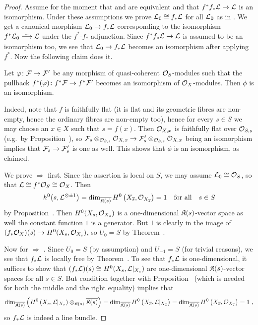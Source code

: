 \documentclass[a4paper,parskip=half,numbers=enddot, DIV=12]{scrreprt}
\begin{document}
\begin{proof}
	Assume for the moment that  and  are equivalent and that $f^*f_*\Ll\morphism \Ll$ is an isomorphism. Under these assumptions we prove $\mathcal{L}_0\cong f_*\mathcal{L}$ for all $\mathcal{L}_0$ as in . We get a canonical morphism $\Ll_0\morphism f_*\Ll$ corresponding to the isomorphism $f^*\Ll_0\isomorphism \Ll$ under the $f^*$-$f_*$ adjunction. Since $f^*f_*\Ll\morphism\Ll$ is assumed to be an isomorphism too, we see that $\Ll_0\morphism f_*\Ll$ becomes an isomorphism after applying $f^*$. Now the following claim does it.
	\begin{claim}
		Let $\phi\colon \Ff\morphism\Ff'$ be any morphism of quasi-coherent $\mathcal{O}_S$-modules such that the pullback $f^*(\phi)\colon f^*\Ff\morphism  f^*\Ff'$ becomes an isomorphism of $\mathcal{O}_X$-modules. Then $\phi$ is an isomorphism.
	\end{claim}
	Indeed, note that $f$ is faithfully flat (it is flat and its geometric fibres are non-empty, hence the ordinary fibres are non-empty too), hence for every $s\in S$ we may choose an $x\in X$ such that $s=f(x)$. Then $\mathcal{O}_{X,x}$ is faithfully flat over $\mathcal{O}_{S,s}$ (e.g.\ by Proposition~), so $\Ff_s\otimes_{\Oo_{S,s}}\Oo_{X,x}\morphism\Ff'_s\otimes_{\Oo_{S,s}}\Oo_{X,x}$ being an isomorphism implies that $\Ff_s \morphism\Ff'_s$ is one as well. This shows that $\phi$ is an isomorphism, as claimed.
	
	We prove  $\Rightarrow$  first. Since the assertion is local on $S$, we may assume $\mathcal{L}_0\cong\mathcal{O}_S$, so that $\mathcal{L}\cong f^*\mathcal{O}_S\cong \mathcal{O}_X$. Then
	\begin{align*}
		h^0\big(s,\mathcal{L}^{\otimes \pm 1}\big)=\dim_{\overline{\mathfrak{K}(s)}}H^0\left(X_{\overline{s}},\mathcal{O}_{X_{\overline{s}}}\right)=1\quad\text{for all}\quad s\in S 
	\end{align*}
	by Proposition~. Then $H^0(X_s,\mathcal{O}_{X_s})$ is a one-dimensional $\mathfrak{K}(s)$-vector space as well the constant function $1$ is a generator. But $1$ is clearly in the image of $(f_*\Oo_X)(s)\morphism H^0(X_s,\Oo_{X_s})$, so $U_0=S$ by Theorem~.
	
	Now for  $\Rightarrow$ . Since $U_0=S$ (by assumption) and $U_{-1}=S$ (for trivial reasons), we see that $f_*\mathcal{L}$ is locally free by Theorem~. To see that $f_*\mathcal{L}$ is one-dimensional, it suffices to show that $(f_*\mathcal{L})(s)\cong H^0(X_s,\mathcal{L}|_{X_s})$ are one-dimensional $\mathfrak{K}(s)$-vector spaces for all $s\in S$. But condition  together with Proposition~ (which is needed for both the middle and the right equality) implies that 
	\begin{align*}
		\dim_{\overline{\mathfrak{K}(s)}}\left(H^0\left(X_s,\mathcal{L}|_{X_s}\right)\otimes_{\mathfrak{K}(s)}\overline{\mathfrak{K}(s)}\right)= \dim_{\overline{\mathfrak{K}(s)}}H^0\left(X_{\overline{s}},\mathcal{L}|_{X_{\overline{s}}}\right)=\dim_{\overline{\mathfrak{K}(s)}}H^0\left(X_{\overline{s}},\mathcal{O}_{X_{\overline{s}}}\right)=1\;,
	\end{align*}
	so $f_*\mathcal{L}$ is indeed a line bundle. 
	

\end{proof}
\end{document}
